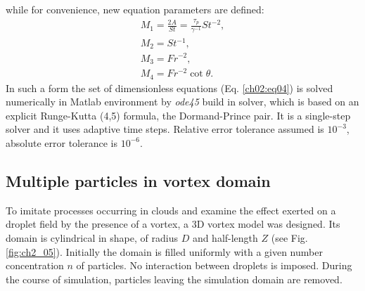 \documentclass[../main.tex]{subfiles}
\begin{document}
while for convenience, new equation parameters are defined:
\begin{align}
M_1=\frac{2A}{St}=\frac{\tau_p}{\gamma^{-1}}St^{-2},\\ \nonumber
M_2=St^{-1},\\ 
M_3=Fr^{-2},\\ \nonumber
M_4=Fr^{-2} \cot{\theta}. \nonumber
\label{def:Mrs}
\end{align}
In such a form the set of dimensionless equations (Eq. \ref{ch02:eq04}) is solved numerically in Matlab environment by \emph{ode45} build in solver, which is based on an explicit Runge-Kutta (4,5) formula, the Dormand-Prince pair. It is a single-step solver and it uses adaptive time steps. Relative error tolerance assumed is $10^{-3}$, absolute error tolerance is $10^{-6}$.

\subsection{Multiple particles in vortex domain}
 
To imitate processes occurring in clouds and examine the effect exerted on a droplet field by the presence of a vortex, a 3D vortex model was designed. Its domain is cylindrical in shape, of radius $D$ and half-length $Z$ (see Fig. \ref{fig:ch2_05}). Initially the domain is filled uniformly with a given number concentration $n$ of particles. No interaction between droplets is imposed. During the course of simulation, particles leaving the simulation domain are removed.
\end{document}
